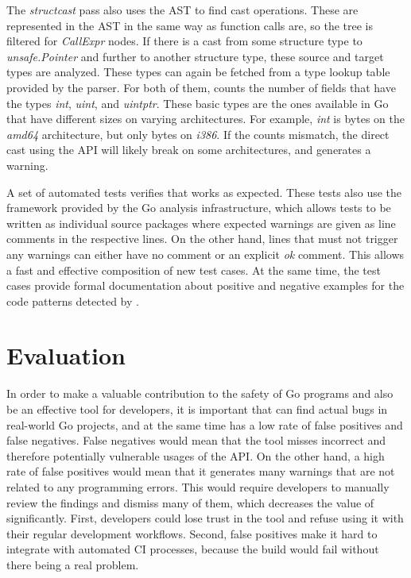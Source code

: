 The \textit{structcast} pass also uses the \acrshort{AST} to find cast operations.
These are represented in the \acrshort{AST} in the same way as function calls are, so the tree is filtered for
\textit{CallExpr} nodes.
If there is a cast from some structure type to \textit{unsafe.Pointer} and further to another structure type, these
source and target types are analyzed.
These types can again be fetched from a type lookup table provided by the parser.
For both of them, \toolSafer{} counts the number of fields that have the types \textit{int}, \textit{uint}, and
\textit{uintptr}.
These  basic types are the ones available in Go that have different sizes on varying architectures.
For example, \textit{int} is  bytes on the \textit{amd64} architecture, but only  bytes
on \textit{i386}.
If the counts mismatch, the direct cast using the \unsafe{} \acrshort{API} will likely break on some architectures,
and \toolSafer{} generates a warning.

A set of automated tests verifies that \toolSafer{} works as expected.
These tests also use the framework provided by the Go analysis infrastructure, which allows tests to be written as
individual source packages where expected warnings are given as line comments in the respective lines.
On the other hand, lines that must not trigger any warnings can either have no comment or an explicit \textit{ok}
comment.
This allows a fast and effective composition of new test cases.
At the same time, the test cases provide formal documentation about positive and negative examples for the code patterns
detected by \toolSafer{}.



\section{Evaluation}\label{sec:go-safer:evaluation}

In order to make a valuable contribution to the safety of Go programs and also be an effective tool for developers, it
is important that \toolSafer{} can find actual bugs in real-world Go projects, and at the same time has a low rate of
false positives and false negatives.
False negatives would mean that the tool misses incorrect and therefore potentially vulnerable usages of the \unsafe{}
\acrshort{API}.
On the other hand, a high rate of false positives would mean that it generates many warnings that are not related to
any programming errors.
This would require developers to manually review the findings and dismiss many of them, which decreases the value of
\toolSafer{} significantly.
First, developers could lose trust in the tool and refuse using it with their regular development workflows.
Second, false positives make it hard to integrate \toolSafer{} with automated \acrshort{CI} processes, because the build
would fail without there being a real problem.

